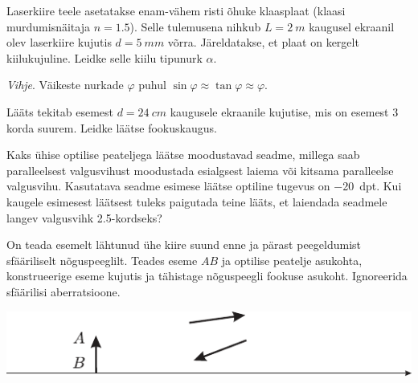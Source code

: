 \documentclass[10pt, twoside]{article}
\begin{document}
{%

Laserkiire teele asetatakse enam-vähem risti õhuke klaasplaat (klaasi murdumisnäitaja $n = \num{1,5}$). Selle tulemusena nihkub $L = \SI{2}{m}$ kaugusel ekraanil olev laserkiire kujutis $d = \SI{5}{mm}$ võrra. Järeldatakse, et plaat on kergelt kiilukujuline. Leidke selle kiilu tipunurk $\alpha$. 

\emph{Vihje}. Väikeste nurkade $\varphi$ puhul $\sin \varphi \approx \tan \varphi \approx \varphi$.
\probend
\bigskip


Lääts tekitab esemest $d = \SI{24}{cm}$ kaugusele ekraanile kujutise, mis on esemest \num{3} korda suurem. Leidke läätse fookuskaugus.
\probend
\bigskip


Kaks ühise optilise peateljega läätse moodustavad seadme, millega saab paralleelsest valgusvihust moodustada esialgsest laiema või kitsama paralleelse valgusvihu. Kasutatava seadme esimese läätse optiline tugevus on \SI{-20}{dpt}. Kui kaugele esimesest läätsest tuleks paigutada teine lääts, et laiendada seadmele langev valgusvihk \num{2.5}-kordseks?
\probend
\bigskip


On teada esemelt lähtunud ühe kiire suund enne ja pärast peegeldumist sfääriliselt nõguspeeglilt. Teades eseme $AB$ ja optilise peatelje asukohta, konstrueerige eseme kujutis ja tähistage nõguspeegli fookuse asukoht. Ignoreerida sfäärilisi aberratsioone.

\begin{center}
	\includegraphics[width=0.9\linewidth]{2006-v3g-02-yl}
\end{center}
\probend
\bigskip

}
\end{document}
